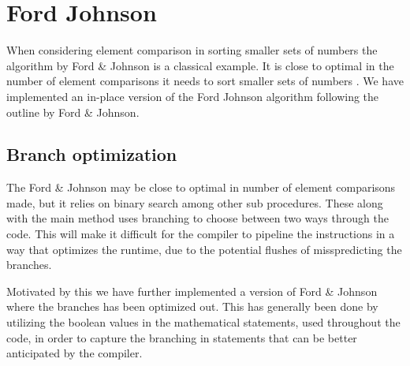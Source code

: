 \section{Ford Johnson}
When considering element comparison in sorting smaller sets of numbers the algorithm by Ford \& Johnson is a classical example\cite{fj59}. It is close to optimal in the number of element comparisons it needs to sort smaller sets of numbers \cite{m77}. We have implemented an in-place version of the Ford Johnson algorithm following the outline by Ford \& Johnson\cite{fj59}.

\subsection{Branch optimization}
The Ford \& Johnson may be close to optimal in number of element comparisons made, but it relies on binary search among other sub procedures. These along with the main method uses branching to choose between two ways through the code. This will make it difficult for the compiler to pipeline the instructions in a way that optimizes the runtime, due to the potential flushes of misspredicting the branches.

Motivated by this we have further implemented a version of Ford \& Johnson where the branches has been optimized out. This has generally been done by utilizing the boolean values in the mathematical statements, used throughout the code, in order to capture the branching in statements that can be better anticipated by the compiler.